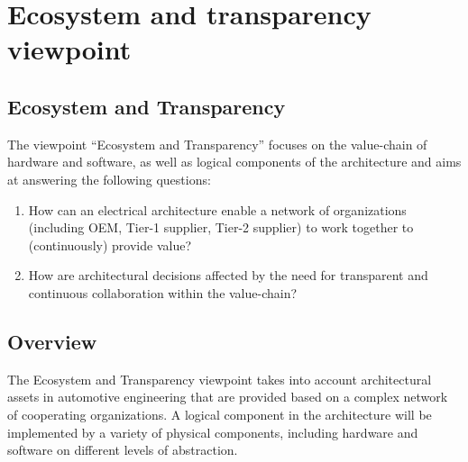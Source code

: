 \section{Ecosystem and transparency viewpoint}\label{sec:ET_VP}
\renewcommand{\Fillin}[1]{{Ecosystem and Transparency}}
\subsection{\Fillin{Viewpoint Name}}\label{vp:eco}


The viewpoint ``\Fillin{Viewpoint Name}'' focuses on the value-chain of hardware and software, as well as logical components of the architecture 
and aims at answering the following questions:
\begin{enumerate}
\item How can an electrical architecture enable a network of organizations (including OEM, Tier-1 supplier, Tier-2 supplier) to work together to (continuously) provide value?
\item How are architectural decisions affected by the need for transparent and continuous collaboration within the value-chain?
\end{enumerate}

\subsection{Overview} 


The \Fillin{Viewpoint Name} viewpoint takes into account architectural assets in automotive engineering that are provided based on a complex network of cooperating organizations. 
A logical component in the architecture will be implemented by a variety of physical components, including hardware and software on different levels of abstraction. 

